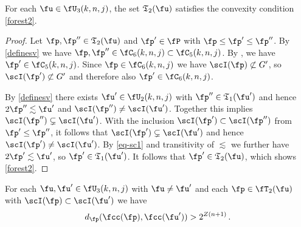 \begin{lemma}
    \label{forest-convex}
    \leanok
    For each $\fu\in \fU_3(k,n,j)$,
    the set $\mathfrak{T}_2(\fu)$
    satisfies the convexity condition \eqref{forest2}.
\end{lemma}

\begin{proof}
    Let $\fp, \fp'' \in \mathfrak{T}_2(\fu)$ and $\fp' \in \fP$ with $\fp \le \fp' \le \fp''$. By \eqref{definesv} we have $\fp, \fp'' \in \fC_6(k,n,j) \subset \fC_5(k,n,j)$. By , we have $\fp' \in \fC_5(k,n,j)$. Since $\fp \in \fC_6(k,n,j)$ we have $\scI(\fp) \not \subset G'$, so $\scI(\fp') \not \subset G'$ and therefore also $\fp' \in \fC_6(k,n,j)$.

    By \eqref{definesv} there exists $\fu' \in \fU_2(k,n,j)$ with $\fp'' \in \mathfrak{T}_1(\fu')$ and hence $2\fp'' \lesssim \fu'$ and $\scI(\fp'') \ne \scI(\fu')$. Together this implies $\scI(\fp'') \subsetneq \scI(\fu')$. With the inclusion $\scI(\fp') \subset \scI(\fp'')$ from $\fp' \le \fp''$, it follows that $\scI(\fp') \subsetneq \scI(\fu')$ and hence $\scI(\fp') \ne \scI(\fu')$.
    By \eqref{eq-sc1} and transitivity of $\lesssim$ we further have $2\fp' \lesssim \fu'$, so $\fp' \in \mathfrak{T}_1(\fu')$.
    It follows that $\fp' \in \mathfrak{T}_2(\fu)$, which shows \eqref{forest2}.
\end{proof}

\begin{lemma}
    \label{forest-separation}
    \leanok
    For each $\fu,\fu'\in \fU_3(k,n,j)$ with $\fu\neq \fu'$ and each $\fp \in \fT_2(\fu)$
    with $\scI(\fp)\subset \scI(\fu')$ we have
    \begin{equation}
    d_{\fp}(\fcc(\fp), \fcc(\fu')) > 2^{Z(n+1)}\,.
    \end{equation}
\end{lemma}

